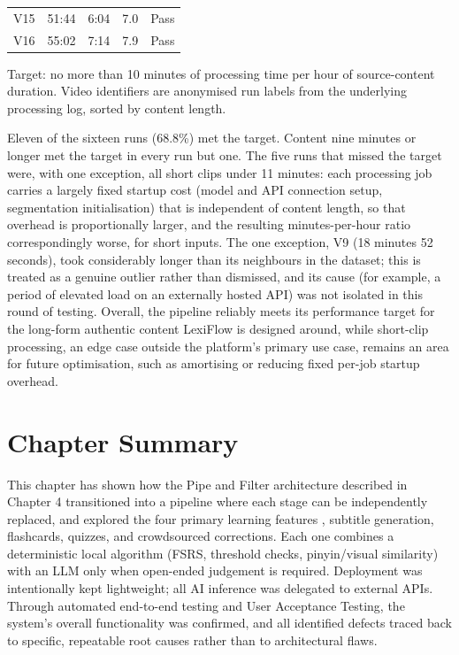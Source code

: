 \documentclass[oneside]{utmthesis}
\begin{document}
\begin{table}[H]
\begin{tabular}{lcccc}
        V15            & 51:44            & 6:04                & 7.0                 & Pass            \\
        V16            & 55:02            & 7:14                & 7.9                 & Pass            \\
        \bottomrule
    \end{tabular}
    \begin{flushleft}
        \small Target: no more than 10 minutes of processing time per hour of source-content duration. Video identifiers are anonymised run labels from the underlying processing log, sorted by content length.
    \end{flushleft}
\end{table}

Eleven of the sixteen runs (68.8\%) met the target. Content nine minutes or longer met the target in every run but one. The five runs that missed the target were, with one exception, all short clips under 11 minutes: each processing job carries a largely fixed startup cost (model and API connection setup, segmentation initialisation) that is independent of content length, so that overhead is proportionally larger, and the resulting minutes-per-hour ratio correspondingly worse, for short inputs. The one exception, V9 (18 minutes 52 seconds), took considerably longer than its neighbours in the dataset; this is treated as a genuine outlier rather than dismissed, and its cause (for example, a period of elevated load on an externally hosted API) was not isolated in this round of testing. Overall, the pipeline reliably meets its performance target for the long-form authentic content LexiFlow is designed around, while short-clip processing, an edge case outside the platform's primary use case, remains an area for future optimisation, such as amortising or reducing fixed per-job startup overhead.

\section{Chapter Summary}
This chapter has shown how the Pipe and Filter architecture described in Chapter 4 transitioned into a pipeline where each stage can be independently replaced, and explored the four primary learning features , subtitle generation, flashcards, quizzes, and crowdsourced corrections. Each one combines a deterministic local algorithm (FSRS, threshold checks, pinyin/visual similarity) with an LLM only when open-ended judgement is required. Deployment was intentionally kept lightweight; all AI inference was delegated to external APIs. Through automated end-to-end testing and User Acceptance Testing, the system's overall functionality was confirmed, and all identified defects traced back to specific, repeatable root causes rather than to architectural flaws.
\end{document}
